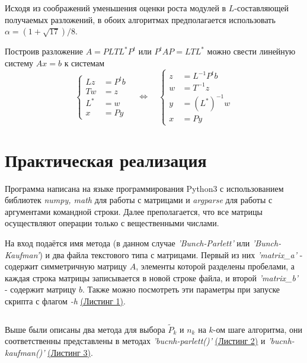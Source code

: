 \documentclass[a4paper, 12pt]{article}   	%
\begin{document}
Исходя из соображений уменьшения оценки роста модулей в $L$-составляющей получаемых разложений, в обоих алгоритмах предполагается использовать $\alpha = (1 + \sqrt{17})/8$.

Построив разложение $A = PLTL^*P^t$ или $P^tAP = LTL^*$ можно свести линейную систему $Ax = b$ к системам
\begin{equation*}\label{part12}
    \begin{cases}
        Lz &= P^t b \\
        Tw &= z \\
        L^* &= w \\
        x &= Py
    \end{cases}
    \quad \Leftrightarrow \quad
    \begin{cases}
        z &= L^{-1} P^t b \\
        w &= T^{-1} z \\
        y &= {(L^*)}^{-1} w \\
        x &= Py
    \end{cases}
\end{equation*}

\newpage

\section{Практическая реализация}

Программа написана на языке программирования Python3 с использованием библиотек {\it numpy, math} для работы с матрицами и {\it argparse} для работы с аргументами командной строки. Далее преполагается, что все матрицы осуществляют операции только с вещественными числами.

На вход подаётся имя метода (в данном случае {\it 'Bunch-Parlett'} или {\it 'Bunch-Kaufman'}) и два файла текстового типа с матрицами. Первый из них {\it 'matrix\_a'} - содержит симметричную матрицу $A$, элементы которой разделены пробелами, а каждая строка матрицы записывается в новой строке файла, и второй {\it 'matrix\_b'} - содержит матрицу $b$. Также можно посмотреть эти параметры при запуске скрипта с флагом {\it -h} \hyperlink{lst:bash_help}{(Листинг 1)}.

\hypertarget{lst:bash_help}{}
\inputminted[frame=single,framesep=10pt, fontsize = \small, linenos=true, breaklines]{bash}{bash_help.sh}

Выше были описаны два метода для выбора $\widetilde{P}_k$ и $n_k$ на $k$-ом шаге алгоритма, они соответственны представлены в методах {\it 'bucnh-parlett()'} \hyperlink{lst:bucnh-parlett}{(Листинг 2)} и {\it 'bucnh-kaufman()'} \hyperlink{lst:bucnh-kaufman}{(Листинг 3)}.
\end{document}
